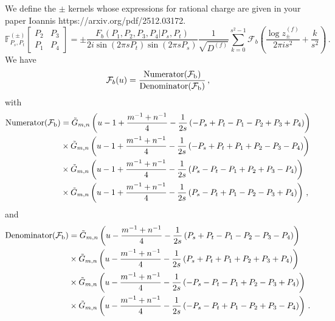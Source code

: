 \documentclass[11pt]{article}
\begin{document}
We define the $\pm$ kernels whose expressions for rational charge are given in your paper Ioannis https://arxiv.org/pdf/2512.03172.
\begin{equation}\label{eq:elementaryblocks}
    \mathbb{F}^{(\pm)}_{P_s, P_t} \begin{bmatrix}
     P_2 & P_3 \\
     P_1 & P_4
    \end{bmatrix}
    =\pm \frac{F_b(P_1,P_2,P_3,P_4|P_s,P_t)}{2 i \sin(2\pi s P_t)\sin(2\pi s P_s)}\frac{1}{\sqrt{D^{(f)}}}\sum_{k=0}^{s^2-1} \mathcal{F}_b\left(\frac{\log z_{\pm}^{(f)}}{2\pi i s^2}+\frac{k}{s^2}\right)\,.
\end{equation}
We have
\begin{equation}
    \mathcal{F}_b(u)=\frac{\rm Numerator(\mathcal{F}_b)}{\rm Denominator(\mathcal{F}_b)}\,,
\end{equation}
with 
\begin{equation}
\begin{aligned}
\rm Numerator(\mathcal{F}_b)&=\tilde{G}_{m,n}\left(u-1+\frac{m^{-1}+n^{-1}}{4}-\frac{1}{2s}\left(-P_s+P_t-P_1-P_2+P_3+P_4\right)\right)\\
&\times \tilde{G}_{m,n}\left(u-1+\frac{m^{-1}+n^{-1}}{4}-\frac{1}{2s}\left(-P_s+P_t+P_1+P_2-P_3-P_4\right)\right)\\
&\times \tilde{G}_{m,n}\left(u-1+\frac{m^{-1}+n^{-1}}{4}-\frac{1}{2s}\left(P_s-P_t-P_1+P_2+P_3-P_4\right)\right)\\
&\times \tilde{G}_{m,n}\left(u-1+\frac{m^{-1}+n^{-1}}{4}-\frac{1}{2s}\left(P_s-P_t+P_1-P_2-P_3+P_4\right)\right)\,,\\
\end{aligned}
\end{equation}
and 
\begin{equation}
\begin{aligned}
\rm Denominator(\mathcal{F}_b)&=\tilde{G}_{m,n}\left(u-\frac{m^{-1}+n^{-1}}{4}-\frac{1}{2s}\left(P_s+P_t-P_1-P_2-P_3-P_4\right)\right)\\
&\times \tilde{G}_{m,n}\left(u-\frac{m^{-1}+n^{-1}}{4}-\frac{1}{2s}\left(P_s+P_t+P_1+P_2+P_3+P_4\right)\right)\\
&\times \tilde{G}_{m,n}\left(u-\frac{m^{-1}+n^{-1}}{4}-\frac{1}{2s}\left(-P_s-P_t-P_1+P_2-P_3+P_4\right)\right)\\
&\times \tilde{G}_{m,n}\left(u-\frac{m^{-1}+n^{-1}}{4}-\frac{1}{2s}\left(-P_s-P_t+P_1-P_2+P_3-P_4\right)\right)\,.
\end{aligned}
\end{equation}
\end{document}
